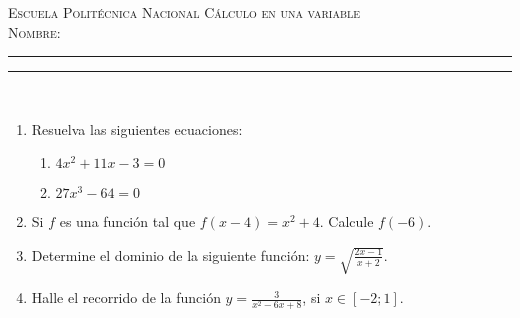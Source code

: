 \documentclass[11pt,a4paper,oneside]{article}\usepackage[]{graphicx}\usepackage[]{color}
\begin{document}
\thispagestyle{empty}
{\sf
{\Large \scshape Escuela Polit\'{e}cnica Nacional} \hfill {\scshape C\'{a}lculo en una variable}\\[7mm]
{\scshape Nombre:} \rule{0.6\textwidth}{0.5pt} \rule{0.1\textwidth}{0.5pt}\\
}











\begin{enumerate}
      \item Resuelva las siguientes ecuaciones:
\begin{enumerate}
  \item $4x^2 +11x-3=0$\\[15mm]
  \item $27x^3 -64=0$\\[15mm]
\end{enumerate}
      
      \item Si $f$ es una funci\'{o}n tal que $f(x-4)=x^2+4$. Calcule $f(-6)$.\\[25mm]
      
      \item Determine el dominio de la siguiente funci\'{o}n: $y=\sqrt{\displaystyle\frac{2x-1}{ x+2}}$.\\[45mm]
      
      \item Halle el recorrido de la funci\'{o}n $y=\displaystyle\frac{3}{x^2-6x+8}$, si $x\in [-2; 1]$.\\[40mm]
      

\end{enumerate}
\end{document}
